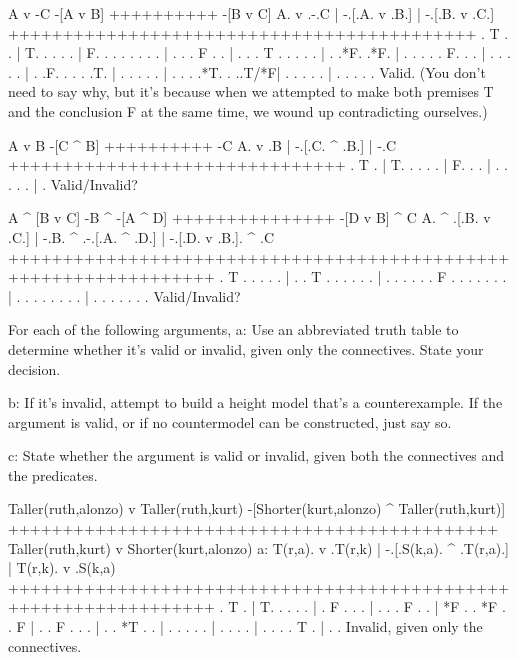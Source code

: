 \problems
{}
\argument
 A v -C
 -[A v B]
++++++++++
 -[B v C]
\endargument
        \answer
        \truthtable
         A. v .-.C | -.[.A. v .B.] | -.[.B. v .C.]
        +++++++++++++++++++++++++++++++++++++++++++
          . T . .  | T. . .   . .  | F. . .   . .
          .   . .  |  . . . F . .  |  . . . T . .
          .   . .  |  . .*F.  .*F. |  . . .   . .
         F.   . .  |  . . .   . .  |  . .F.   . .
          .   .T.  |  . . .   . .  |  . . .   .*T.
          .  ..T/*F|  . . .   . .  |  . . .   . .
        \endtruthtable
        Valid. (You don't need to say why, but it's because when we attempted to make both premises T and the conclusion F at the same time, we wound up contradicting ourselves.)
        \endanswer

\argument
 A v B
 -[C ^ B]
++++++++++
 -C
\endargument
        \answer
        \truthtable
         A. v .B | -.[.C. ^ .B.] | -.C
        +++++++++++++++++++++++++++++++
          . T .  | T. . .   . .  | F.
          .   .  |  . . .   . .  |  .
        \endtruthtable
        Valid/Invalid?
        \endanswer

\argument
 A ^ [B v C]
 -B ^ -[A ^ D]
+++++++++++++++
 -[D v B] ^ C
\endargument
        \answer
        \truthtable
         A. ^ .[.B. v .C.] | -.B. ^ .-.[.A. ^ .D.] | -.[.D. v .B.]. ^ .C
        +++++++++++++++++++++++++++++++++++++++++++++++++++++++++++++++++
          . T . . .   . .  |  . . T . . . .   . .  |  . . .   . . . F . 
          .   . . .   . .  |  . .   . . . .   . .  |  . . .   . . .   . 
        \endtruthtable
        Valid/Invalid?
        \endanswer

\endproblems

For each of the following arguments,
\list
a: Use an abbreviated truth table to determine whether it's valid or invalid, given only the connectives. State your decision.

b: If it's invalid, attempt to build a height model that's a counterexample. If the argument is valid, or if no countermodel can be constructed, just say so.

c: State whether the argument is valid or invalid, given both the connectives and the predicates.
\endlist

\problems
{}
\argument
 Taller(ruth,alonzo) v Taller(ruth,kurt)
 -[Shorter(kurt,alonzo) ^ Taller(ruth,kurt)]
+++++++++++++++++++++++++++++++++++++++++++++
 Taller(ruth,kurt) v Shorter(kurt,alonzo)
\endargument
        \answerlist
        a:
        \truthtable
         T(r,a). v .T(r,k) | -.[.S(k,a). ^ .T(r,a).] | T(r,k). v .S(k,a)
        +++++++++++++++++++++++++++++++++++++++++++++++++++++++++++++++++
               . T .       | T. .      .   .      .  |       . F .
               .   .       |  . .      . F .      .  |   *F  .   .  *F
               .   .   F   |  . . F    .   .      .  |       .   .
           *T  .   .       |  . .      .   .      .  |       .   .
               .   .       |  . .      .   .   T  .  |       .   .
        \endtruthtable
        Invalid, given only the connectives.

